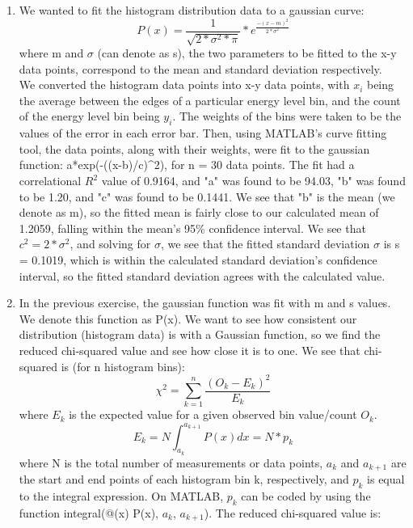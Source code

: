 \documentclass{article}
\begin{document}
\begin{enumerate}
        \item We wanted to fit the histogram distribution data to a gaussian curve:
        \begin{equation}
            P(x) = \frac{1}{\sqrt{2*\sigma^2 *\pi}}*e^{\frac{-(x-m)^2}{2*\sigma^2}}
        \end{equation}
        where m and $\sigma$ (can denote as s), the two parameters to be fitted to the x-y data points, correspond to the mean and standard deviation respectively.\\
        We converted the histogram data points into x-y data points, with $x_i$ being the average between the edges of a particular energy level bin, and the count of the energy level bin being $y_i$. The weights of the bins were taken to be the values of the error in each error bar. Then, using MATLAB's curve fitting tool, the data points, along with their weights, were fit to the gaussian function: a*exp(-((x-b)/c)\^{}2), for n = 30 data points. The fit had a correlational $R^2$ value of 0.9164, and "a" was found to be 94.03, "b" was found to be 1.20, and "c" was found to be 0.1441. We see that "b" is the mean (we denote as m), so the fitted mean is fairly close to our calculated mean of 1.2059, falling within the mean's 95\% confidence interval. We see that $c^2 = 2*\sigma^2$, and solving for $\sigma$, we see that the fitted standard deviation $\sigma$ is s = 0.1019, which is within the calculated standard deviation's confidence interval, so the fitted standard deviation agrees with the calculated value.
        \item In the previous exercise, the gaussian function was fit with m and s values. We denote this function as P(x). We want to see how consistent our distribution (histogram data) is with a Gaussian function, so we find the reduced chi-squared value and see how close it is to one. We see that chi-squared is (for n histogram bins):
        \begin{equation}
            \chi^{2} = \sum_{k=1}^{n} \frac{(O_k-E_k)^2}{E_k}
        \end{equation}
        where $E_k$ is the expected value for a given observed bin value/count $O_k$. 
        \begin{equation}
            E_k = N \int_{a_k}^{a_{k+1}} P(x) dx = N*p_k
        \end{equation}
        where N is the total number of measurements or data points, $a_k$ and $a_{k+1}$ are the start and end points of each histogram bin k, respectively, and $p_k$ is equal to the integral expression. On MATLAB, $p_k$ can be coded by using the function integral(@(x) P(x), $a_{k}$, $a_{k+1}$). The reduced chi-squared value is:

\end{enumerate}
\end{document}
